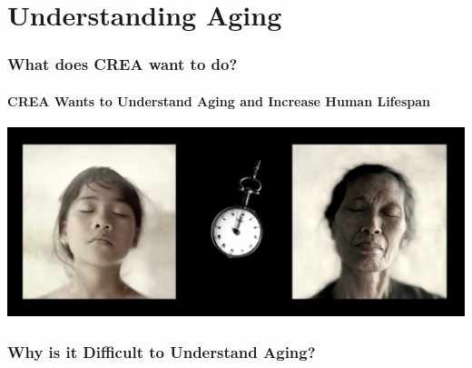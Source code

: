 \documentclass[mathserif]{beamer}
\begin{document}
\section{Understanding Aging}

\begin{frame}

\frametitle{What does CREA want to do?}
\framesubtitle{CREA Wants to Understand Aging and Increase Human Lifespan}

\centering

\includegraphics[width=0.75\linewidth]{images/aging.jpg}


\end{frame}

\begin{frame}

\frametitle{Why is it Difficult to Understand Aging?}

\centering
{}

\end{frame}
\end{document}
